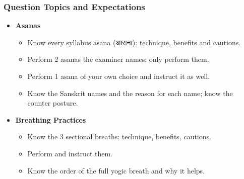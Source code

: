 \begin{frame}[fragile]\frametitle{Question Topics and Expectations}
    \begin{itemize}
        \item \textbf{Asanas}
        \begin{itemize}
            \item Know every syllabus asana (आसना): technique, benefits and cautions.
            \item Perform 2 asanas the examiner names; only perform them.
            \item Perform 1 asana of your own choice and instruct it as well.
            \item Know the Sanskrit names and the reason for each name; know the counter posture.
        \end{itemize}
        \item \textbf{Breathing Practices}
        \begin{itemize}
            \item Know the 3 sectional breaths: technique, benefits, cautions.
            \item Perform and instruct them.
            \item Know the order of the full yogic breath and why it helps.
        \end{itemize}

    \end{itemize}
\end{frame}

